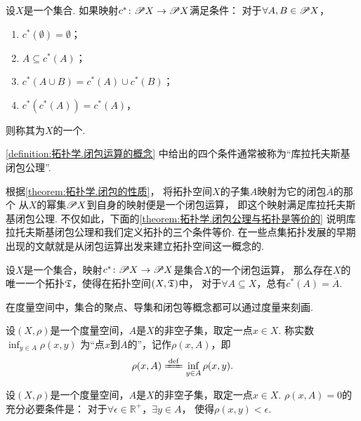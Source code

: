 \begin{definition}\label{definition:拓扑学.闭包运算的概念}
设\(X\)是一个集合.
如果映射\(c^*\colon \mathscr{P} X \to \mathscr{P} X\)满足条件：
对于\(\forall A,B \in \mathscr{P} X\)，\begin{enumerate}
	\item \(c^*(\emptyset) = \emptyset\)；
	\item \(A \subseteq c^*(A)\)；
	\item \(c^*(A \cup B) = c^*(A) \cup c^*(B)\)；
	\item \(c^*(c^*(A)) = c^*(A)\)，
\end{enumerate}
则称其为\(X\)的一个.
\end{definition}
\cref{definition:拓扑学.闭包运算的概念} 中给出的四个条件通常被称为“库拉托夫斯基闭包公理”.

根据\cref{theorem:拓扑学.闭包的性质}，
将拓扑空间\(X\)的子集\(A\)映射为它的闭包\(\overline{A}\)的那个
从\(X\)的幂集\(\mathscr{P} X\)到自身的映射便是一个闭包运算，
即这个映射满足库拉托夫斯基闭包公理.
不仅如此，下面的\cref{theorem:拓扑学.闭包公理与拓扑是等价的}
说明库拉托夫斯基闭包公理和我们定义拓扑的三个条件等价.
在一些点集拓扑发展的早期出现的文献就是从闭包运算出发来建立拓扑空间这一概念的.

\begin{theorem}\label{theorem:拓扑学.闭包公理与拓扑是等价的}
设\(X\)是一个集合，映射\(c^*\colon \mathscr{P} X \to \mathscr{P} X\)是集合\(X\)的一个闭包运算，
那么存在\(X\)的唯一一个拓扑\(\mathfrak T\)，使得在拓扑空间\((X,\mathfrak T)\)中，
对于\(\forall A \subseteq X\)，总有\(c^*(A) = \overline{A}\).
\end{theorem}

在度量空间中，集合的聚点、导集和闭包等概念都可以通过度量来刻画.

\begin{definition}\label{definition:拓扑学.点到点集的距离}
\def\d{\inf_{y \in A} \rho(x,y)}%
设\((X,\rho)\)是一个度量空间，\(A\)是\(X\)的非空子集，取定一点\(x \in X\).
称实数\(\d\)
为“点\(x\)到\(A\)的”，记作\(\rho(x,A)\)，即\[
\rho(x,A) \defeq \d.
\]
\end{definition}

\begin{theorem}
设\((X,\rho)\)是一个度量空间，\(A\)是\(X\)的非空子集，取定一点\(x \in X\).
\(\rho(x,A) = 0\)的充分必要条件是：
对于\(\forall\epsilon\in\mathbb{R}^+\)，\(\exists y \in A\)，
使得\(\rho(x,y)<\epsilon\).
\end{theorem}

